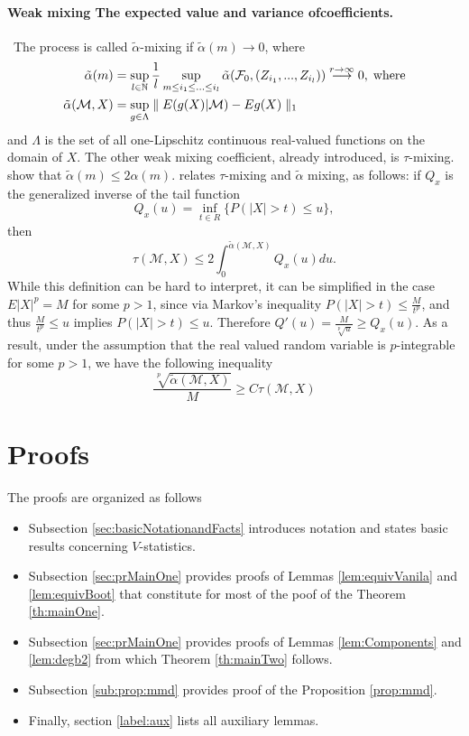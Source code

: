 \paragraph{Weak mixing The expected value and variance ofcoefficients.}\
The process is called $\tilde \alpha$-mixing if $\tilde \alpha(m) \rightarrow 0$, where 
\begin{align*}
\tilde \alpha(m)  &= \sup_{l \in \mathbb{N}} \frac 1 l \sup_{ m \leq i_1 \leq ... \leq i_l} \tilde \alpha( \mathcal F_0,(Z_{i_1},...,Z_{i_l}) )  \overset{r \to \infty}{\longrightarrow} 0,\;\text{where} \\
\tilde \alpha(\mathcal{M},X)  &=    \sup_{g \in \Lambda} \parallel  E(g(X)|\mathcal{M})  - E g(X) \parallel_{1} 
\end{align*}
and $\Lambda$ is the set of all one-Lipschitz continuous real-valued functions on the domain of $X$.
The other weak mixing coefficient, already introduced,  is $\tau$-mixing. \cite[Remark 2.4]{dedecker2007weak} show that $\tilde \alpha(m) \leq 2\alpha(m)$. \cite[Proposition 2]{dedecker2005new} relates $\tau$-mixing and $\tilde \alpha$ mixing, as follows: if $Q_x$ is the generalized inverse of the tail function
\[
 Q_x(u) = \inf_{t \in R} \{  P(|X| > t) \leq u\},  
\]
then
\[
 \tau(\mathcal{M},X) \leq 2 \int_{0}^{\tilde \alpha(\mathcal{M},X)}  Q_x(u) du.
\]
While this definition can be hard to interpret, it can be simplified in the case $E|X|^p=M$  for some $p>1$, since via Markov's inequality $P(|X|>t) \leq \frac{M}{t^p}$, and thus $\frac{M}{t^p} \leq u $ implies $P(|X|>t) \leq u$. Therefore $Q'(u) = \frac{M}{\sqrt[p]{u}} \geq Q_x(u)$. As a result, under the assumption that the real valued random variable is $p$-integrable for some $p>1$, we have the following inequality 
\[
 \frac{ \sqrt[p]{\tilde   \alpha(\mathcal{M},X)}}{M}  \geq C  \tau(\mathcal{M},X) 
\]



\section{Proofs}
The proofs are organized as follows 
\begin{itemize}
\item Subsection \ref{sec:basicNotationandFacts} introduces notation and states basic results concerning $V$-statistics.
\item Subsection \ref{sec:prMainOne} provides proofs of Lemmas \ref{lem:equivVanila} and \ref{lem:equivBoot} that constitute for most of the poof of the Theorem \ref{th:mainOne}.
\item  Subsection \ref{sec:prMainOne} provides proofs of Lemmas \ref{lem:Components} and \ref{lem:degb2} from which Theorem \ref{th:mainTwo} follows.
\item Subsection \ref{sub:prop:mmd}  provides proof of the Proposition \ref{prop:mmd}.
\item Finally, section \ref{label:aux} lists all auxiliary lemmas. 
\end{itemize}

